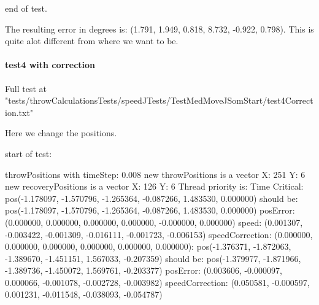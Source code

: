 end of test.\newline 

The resulting error in degrees is: (1.791, 1.949, 0.818, 8.732, -0.922, 0.798). This is quite alot different from where we want to be.

\paragraph{test4 with correction}
Full test at "tests/throwCalculationsTests/speedJTests/TestMedMoveJSomStart/test4Correction.txt"

Here we change the positions. \newline 

start of test: \newline 

throwPositions with timeStep:  0.008\newline
new throwPositions is a vector X: 251 Y:  6\newline
new recoveryPositions is a vector X: 126 Y:  6\newline
Thread priority is: Time Critical\newline
[0.000000s - Step 0/251]:\newline
\hspace{1cm}        pos(-1.178097, -1.570796, -1.265364, -0.087266, 1.483530, 0.000000) should be:\newline
\hspace{1cm}        pos(-1.178097, -1.570796, -1.265364, -0.087266, 1.483530, 0.000000)\newline
\hspace{1cm}        posError: (0.000000, 0.000000, 0.000000, 0.000000, -0.000000, 0.000000)
\hspace{1cm}        speed: (0.001307, -0.003422, -0.001309, -0.016111, -0.001723, -0.006153)\newline
\hspace{1cm}        speedCorrection: (0.000000, 0.000000, 0.000000, 0.000000, 0.000000, 0.000000)\newline
[2.000000s - Step 250/251]:\newline
\hspace{1cm}        pos(-1.376371, -1.872063, -1.389670, -1.451151, 1.567033, -0.207359) should be:\newline
\hspace{1cm}        pos(-1.379977, -1.871966, -1.389736, -1.450072, 1.569761, -0.203377)\newline
\hspace{1cm}        posError: (0.003606, -0.000097, 0.000066, -0.001078, -0.002728, -0.003982)\newline
\hspace{1cm}        speedCorrection: (0.050581, -0.000597, 0.001231, -0.011548, -0.038093, -0.054787)\newline

